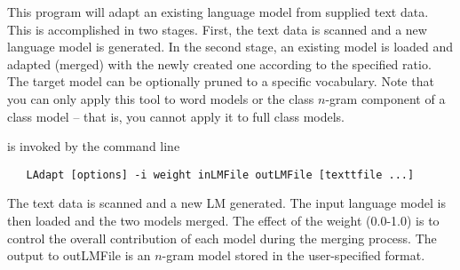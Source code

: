 %
%
%

\newpage
{}


This program will adapt an existing language model from supplied text
data.  This is accomplished in two stages. First, the text data is
scanned and a new language model is generated. In the second stage, an
existing model is loaded and adapted (merged) with the newly created
one according to the specified ratio.  The target model can be
optionally pruned to a specific vocabulary.  Note that you can only
apply this tool to word models or the class $n$-gram component of a
class model -- that is, you cannot apply it to full class models.


 is invoked by the command line
\begin{verbatim}
   LAdapt [options] -i weight inLMFile outLMFile [texttfile ...]
\end{verbatim}
The text data is scanned and a new LM generated. The input language model is
then loaded and the two models merged. The effect of the weight (0.0-1.0) is to
control the overall contribution of each model during the merging process. The
output to outLMFile is an $n$-gram model stored in the user-specified format.

